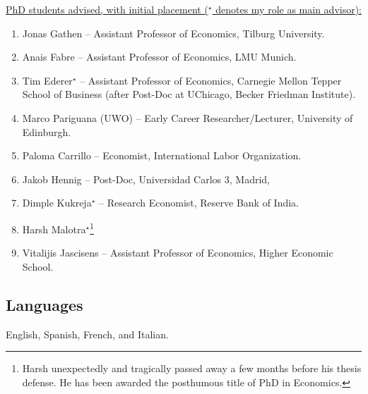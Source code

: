 \documentclass[12pt,english]{article}
\newcommand\reverselabel[1]{%
  \def\theenumi{}%
  \renewcommand\makelabel{\makebox[\dimexpr\labelwidth-3pt\relax][r]{%
    \the\numexpr#1-\value{enumi}+1\relax}}}%
\begin{document}
\noindent \underline{PhD students advised, with initial placement ($^\star$ denotes my role as main advisor):} 
\begin{enumerate}\reverselabel{9}
\item Jonas Gathen -- Assistant Professor of Economics, Tilburg University.
\item Anais Fabre -- Assistant Professor of Economics, LMU Munich.
\item Tim Ederer$^\star$ -- Assistant Professor of Economics, Carnegie Mellon Tepper School of Business (after Post-Doc at UChicago, Becker Friedman Institute).
\item Marco Pariguana (UWO) -- Early Career Researcher/Lecturer, University of Edinburgh.
\item Paloma Carrillo -- Economist, International Labor Organization.
\item Jakob Hennig -- Post-Doc, Universidad Carlos 3, Madrid,
\item Dimple Kukreja$^\star$ --  Research Economist, Reserve Bank of India.
\item Harsh Malotra$^\star$\footnote{Harsh unexpectedly and tragically passed away a few months before his thesis defense. He has been awarded the posthumous title of PhD in Economics.} 
\item Vitalijis Jascisens -- Assistant Professor of Economics, Higher Economic School.
\end{enumerate}

\subsection*{Languages}
English, Spanish, French, and Italian.
\end{document}
